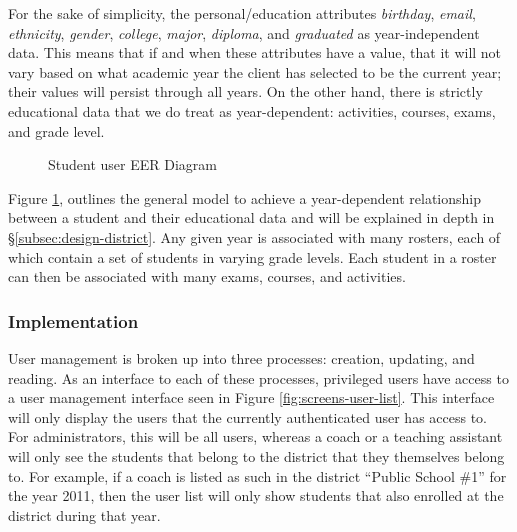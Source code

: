 For the sake of simplicity, the personal/education attributes \emph{birthday}, \emph{email}, \emph{ethnicity}, \emph{gender}, \emph{college}, \emph{major}, \emph{diploma}, and \emph{graduated} as year-independent data. This means that if and when these attributes have a value, that it will not vary based on what academic year the client has selected to be the current year; their values will persist through all years. On the other hand, there is strictly educational data that we do treat as year-dependent: activities, courses, exams, and grade level.

\begin{figure}[h!]
	\centering
	\caption{Student user EER Diagram}
	\label{fig:er-user-student}
\end{figure}

Figure \ref{fig:er-user-student}, outlines the general model to achieve a year-dependent relationship between a student and their educational data and will be explained in depth in \S \ref{subsec:design-district}. Any given year is associated with many rosters, each of which contain a set of students in varying grade levels. Each student in a roster can then be associated with many exams, courses, and activities. 

\subsubsection{Implementation}
User management is broken up into three processes: creation, updating, and reading. As an interface to each of these processes, privileged users have access to a user management interface seen in Figure \ref{fig:screens-user-list}. This interface will only display the users that the currently authenticated user has access to. For administrators, this will be all users, whereas a coach or a teaching assistant will only see the students that belong to the district that they themselves belong to. For example, if a coach is listed as such in the district ``Public School \#1'' for the year 2011, then the user list will only show students that also enrolled at the district during that year.

